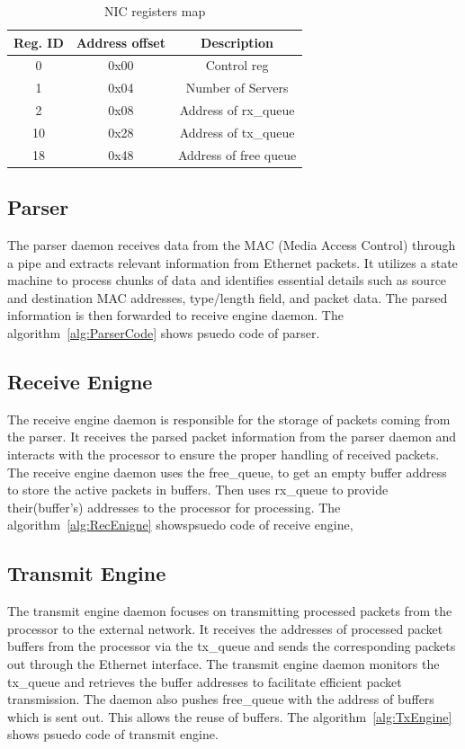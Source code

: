 \documentclass[12pt]{report}
\begin{document}
			\begin{table}[h!]
				\centering
				\begin{tabular}{|c|c|c|}
					\hline
					Reg. ID& Address offset & Description  \\ \hline
					0  & 0x00  & Control reg    \\ \hline
					1  & 0x04  & Number of Servers    \\ \hline
					2  & 0x08  & Address of rx\_queue    \\ \hline
					10  & 0x28  & Address of tx\_queue    \\ \hline
					18  & 0x48  & Address of free queue    \\ \hline
				\end{tabular}
				\caption{NIC registers map}
				\label{tab:NIC_REG}
			\end{table}


		\subsection{Parser}
				The parser daemon receives data from the MAC (Media Access Control) through a pipe and extracts relevant information from Ethernet packets. It utilizes a state machine to process chunks of data and identifies essential details such as source and destination MAC addresses, type/length field, and packet data. The parsed information is then forwarded to receive engine daemon. The algorithm~\ref{alg:ParserCode} shows psuedo code of parser.

		\subsection{Receive Enigne}
				The receive engine daemon is responsible for the storage of packets coming from the parser. It receives the parsed packet information from the parser daemon and interacts with the processor to ensure the proper handling of received packets. The receive engine daemon uses the free\_queue, to get an empty buffer address to store the active packets in buffers.
			Then uses rx\_queue to provide their(buffer's) addresses to the processor for processing. The algorithm~\ref{alg:RecEnigne} showspsuedo code of receive engine,
		\subsection{Transmit Engine}
				The transmit engine daemon focuses on transmitting processed packets from the processor to the external network. It receives the addresses of processed packet buffers from the processor via the tx\_queue and sends the corresponding packets out through the Ethernet interface. The transmit engine daemon monitors the tx\_queue and retrieves the buffer addresses to facilitate efficient packet transmission. The daemon also pushes free\_queue with the address of buffers which is sent out. This allows the reuse of buffers. The algorithm~\ref{alg:TxEngine} shows psuedo code of transmit engine.
\end{document}

